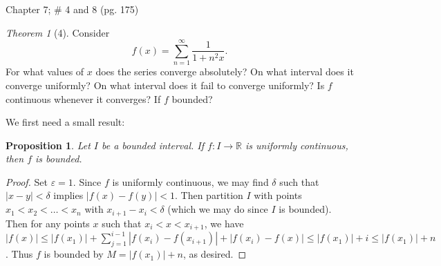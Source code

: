 \documentclass[12pt]{article}
\newtheorem*{prop}{Proposition}
\theoremstyle{remark}
\theoremstyle{named}
\newtheorem*{theorem}{Theorem}
\renewcommand{\d}{\delta}
\newcommand{\e}{\varepsilon}
\newcommand{\R}{\mathbb R}
\newcommand{\abs}[1]{|#1|}
\begin{document}
Chapter 7; \# 4 and 8 (pg. 175)

\begin{theorem}[4]
    Consider \[f(x) = \sum_{n = 1}^\infty \frac{1}{1 + n^2x}.\]
    For what values of \(x\) does the series converge absolutely? On what interval does it converge uniformly? On what interval does it fail to converge uniformly? Is \(f\) continuous whenever it converges? If \(f\) bounded?
\end{theorem}

We first need a small result:
\begin{prop}
    Let \(I\) be a bounded interval. If \(f : I \to \R\) is uniformly continuous, then \(f\) is bounded. 
\end{prop}

\begin{proof}
    Set \(\e = 1\). Since \(f\) is uniformly continuous, we may find \(\d\) such that \(\abs{x - y} < \d\) implies \(\abs{f(x) - f(y)} < 1\). Then partition \(I\) with points \(x_1 < x_2 < \dots < x_n\) with \(x_{i + 1} - x_i < \d\) (which we may do since \(I\) is bounded). Then for any points \(x\) such that \(x_i < x < x_{i + 1}\), we have \(\abs{f(x)} \le \abs{f(x_1)} + \sum_{j = 1}^{i - 1} \abs{f(x_i) - f(x_{i + 1})} + \abs{f(x_i) - f(x)} \le \abs{f(x_1)} + i \le \abs{f(x_1)} + n\). Thus \(f\) is bounded by \(M = \abs{f(x_1)} + n\), as desired.
\end{proof}
\end{document}
